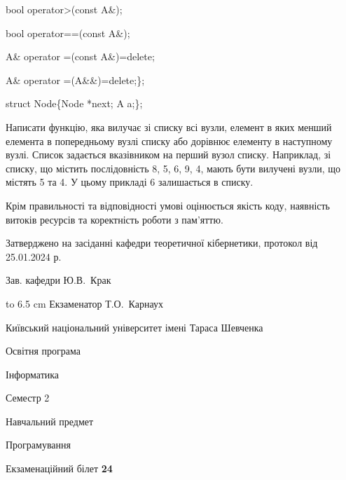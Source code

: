 \documentclass[12pt, ukrainian]{article}
\begin{document}
{\quad  bool operator>(const A\&); 

\quad  bool operator==(const A\&); 

\quad A\& operator =(const A\&)=delete; 

\quad  A\& operator =(A\&\&)=delete;\};

struct Node\{Node *next; A a;\};

 Написати функцію, яка вилучає зі списку всі вузли, елемент в яких менший елемента в попередньому вузлі списку або дорівнює елементу в наступному вузлі. Список задається вказівником на перший вузол списку. Наприклад, зі списку, що містить послідовність 8, 5, 6, 9, 4, мають бути вилучені вузли, що містять 5 та 4. У цьому прикладі 6 залишається в списку.

Крім правильності та відповідності умові оцінюється якість коду, наявність витоків ресурсів та коректність роботи з пам'яттю. 

}
{\smallskip\smallskip \begin {scriptsize} Затверджено на засіданні кафедри теоретичної кібернетики, протокол   від   25.01.2024 р.\par\smallskip\smallskip\smallskip\smallskip
{\parbox {6.5 cm} {Зав. кафедри \dotfill Ю.В.~Крак}}\hspace {0.7cm} {\hbox to 6.5 cm { Екзаменатор \dotfill Т.О.~Карнаух}} \end{scriptsize}}
\newpage
{{\begin {scriptsize}\par
{ \center  Київський національний університет імені Тараса Шевченка \par}
{\parbox {5 cm}{Освітня програма \hfill}{\parbox {7 cm}{Інформатика\hfill}}\parbox {6 cm}{\hfill Семестр 2}}\par
{\parbox {5 cm} {Навчальний предмет \hfill}\parbox {7 cm}{Програмування \hfill}\parbox {6cm}{\hfill}\par}\vspace{-15pt} \end{scriptsize}}{\center Екзаменаційний білет \No \textbf { 24 }\par}}
\end{document}
